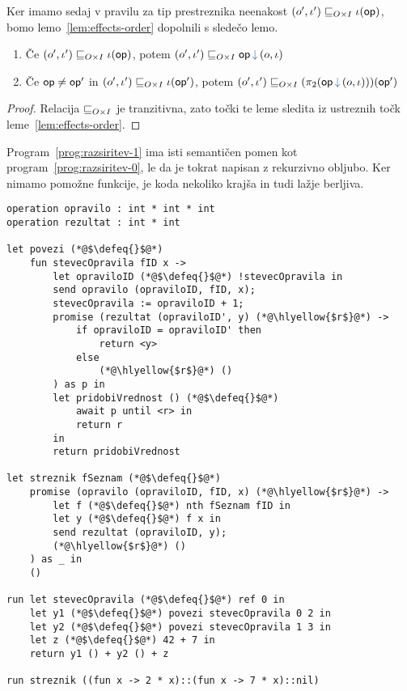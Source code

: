 Ker imamo sedaj v pravilu za tip prestreznika neenakost $(o', \iota') \sqsubseteq_{O \times I} \iota(\mathsf{op})$, bomo lemo~\ref{lem:effects-order} dopolnili s sledečo lemo.

\begin{lema}\label{lem:effects-order-2}
	\begin{enumerate}
		\item\label{lem:eo2-1} Če $(o', \iota') \sqsubseteq_{O \times I} \iota(\mathsf{op})$, potem $(\o', \i') \order{O \times I} \opincomp{\op}{(\o, \i)}$
		\item\label{lem:eo2-2} Če $\mathsf{op} \neq \mathsf{op}'$ in $(o', \iota') \sqsubseteq_{O \times I} \iota(\mathsf{op}')$, potem $(\o', \i') \order{O \times I} (\pi_2(\opincomp{\op}{(\o, \i)}))(\op')$
	\end{enumerate}
\end{lema}

\begin{proof}
	Relacija $\sqsubseteq_{O \times I}$ je tranzitivna, zato točki te leme sledita iz ustreznih točk leme~\ref{lem:effects-order}.
\end{proof}


Program~\ref{prog:razsiritev-1} ima isti semantičen pomen kot program~\ref{prog:razsiritev-0}, le da je tokrat napisan z rekurzivno obljubo.
Ker nimamo pomožne funkcije, je koda nekoliko krajša in tudi lažje berljiva.

\begin{lstlisting}[caption={Primer z rekurzivnim prestreznikom},label={prog:razsiritev-1},float,floatplacement=h]
operation opravilo : int * int * int
operation rezultat : int * int

let povezi (*@$\defeq{}$@*)
	fun stevecOpravila fID x ->
		let opraviloID (*@$\defeq{}$@*) !stevecOpravila in
		send opravilo (opraviloID, fID, x);
		stevecOpravila := opraviloID + 1;
		promise (rezultat (opraviloID', y) (*@\hlyellow{$r$}@*) ->
			if opraviloID = opraviloID' then
				return <y>
			else
				(*@\hlyellow{$r$}@*) ()
		) as p in
		let pridobiVrednost () (*@$\defeq{}$@*) 
			await p until <r> in
			return r
		in
		return pridobiVrednost

let streznik fSeznam (*@$\defeq{}$@*)
	promise (opravilo (opraviloID, fID, x) (*@\hlyellow{$r$}@*) ->
		let f (*@$\defeq{}$@*) nth fSeznam fID in
		let y (*@$\defeq{}$@*) f x in
		send rezultat (opraviloID, y);
		(*@\hlyellow{$r$}@*) ()
	) as _ in
	()

run	let stevecOpravila (*@$\defeq{}$@*) ref 0 in
	let y1 (*@$\defeq{}$@*) povezi stevecOpravila 0 2 in
	let y2 (*@$\defeq{}$@*) povezi stevecOpravila 1 3 in
	let z (*@$\defeq{}$@*) 42 + 7 in
	return y1 () + y2 () + z

run streznik ((fun x -> 2 * x)::(fun x -> 7 * x)::nil)
\end{lstlisting}


